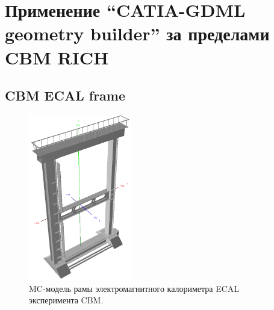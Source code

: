 \section{Применение ``CATIA-GDML geometry builder'' за пределами CBM RICH}\label{sec:secBuilderOtherUsage}


\subsection{CBM ECAL frame}\label{sec:secCbmEcalFrame}


\begin{figure}[H]
\centering
\includegraphics[width=0.4\textwidth]{pictures/CBM_ECAL_frame.png}
\caption{MC-модель рамы электромагнитного калориметра ECAL эксперимента CBM.}
\label{fig:CbmEcalFrame}
\end{figure}


